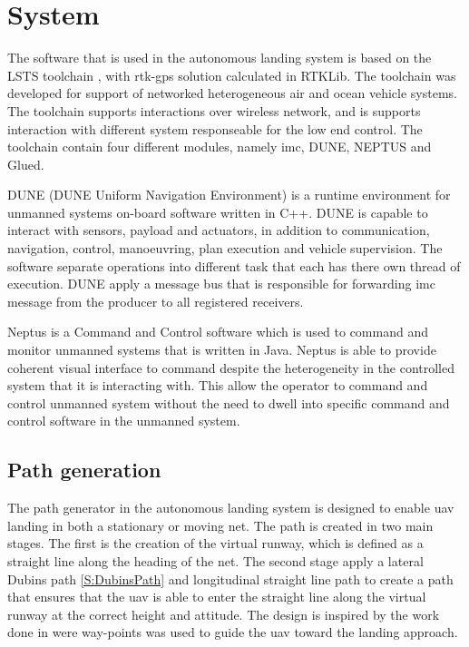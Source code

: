 

\chapter{System}
The software that is used in the autonomous landing system is based on the LSTS toolchain \citep{pinto2013lsts}, with \gls{rtk-gps} solution calculated in RTKLib. The toolchain was developed for support of networked heterogeneous air and ocean vehicle systems. The toolchain supports interactions over wireless network, and is supports interaction with different system responseable for the low end control. The toolchain contain four different modules, namely \gls{imc}, DUNE, NEPTUS and Glued.

DUNE (DUNE Uniform Navigation Environment) is a runtime environment for unmanned systems on-board software written in C++. DUNE is capable to interact with sensors, payload and actuators, in addition to communication, navigation, control, manoeuvring, plan execution and vehicle supervision. The software separate operations into different task that each has there own thread of execution. DUNE apply a message bus that is responsible for forwarding \gls{imc} message from the producer to all registered receivers.

Neptus is a Command and Control software which is used to command and monitor unmanned systems that is written in Java. Neptus is able to provide coherent visual interface to command despite the heterogeneity in the controlled system that it is interacting with.  This allow the operator to command and control unmanned system without the need to dwell into specific command and control software in the unmanned system.
\section{Path generation}
The path generator in the  autonomous landing system is designed to enable \gls{uav} landing in both a stationary or moving net. The path is created in two main stages. The first is the creation of the virtual runway, which is defined as a straight line along the heading of the net. The second stage apply a lateral Dubins path \ref{S:DubinsPath} and longitudinal straight line path to create a path that ensures that the \gls{uav} is able to enter the straight line along the virtual runway at the correct height and attitude. The design is inspired by the work done in \citep{Skulstad&Syversen} were way-points was used to guide the \gls{uav} toward the landing approach.

